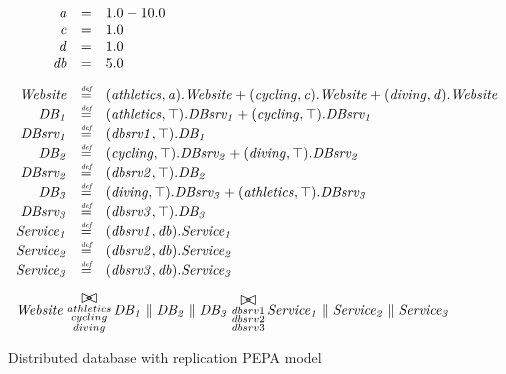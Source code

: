 \documentclass[runningheads]{llncs}
\begin{document}
\begin{figure}
	\centering
	\begin{displaymath}
	\begin{array}{rcl}
	\mathit{a} & = & 1.0-10.0\\
	\mathit{c} & = & 1.0\\
	\mathit{d} & = & 1.0\\
	\mathit{db} & = & 5.0\\
	[2.0ex]		\mathit{Website} & \rmdef & (\mathit{athletics},\mathit{a}).\mathit{Website}+(\mathit{cycling},\mathit{c}).\mathit{Website}+(\mathit{diving},\mathit{d}).\mathit{Website}\\
	\mathit{DB_1} & \rmdef & (\mathit{athletics},\top).\mathit{DBsrv_1}+(\mathit{cycling},\top).\mathit{DBsrv_1}\\
	\mathit{DBsrv_1} & \rmdef & (\mathit{dbsrv1},\top).\mathit{DB_1}\\
	\mathit{DB_2} & \rmdef & (\mathit{cycling},\top).\mathit{DBsrv_2}+(\mathit{diving},\top).\mathit{DBsrv_2}\\
	\mathit{DBsrv_2} & \rmdef & (\mathit{dbsrv2},\top).\mathit{DB_2}\\
	\mathit{DB_3} & \rmdef & (\mathit{diving},\top).\mathit{DBsrv_3}+(\mathit{athletics},\top).\mathit{DBsrv_3}\\
	\mathit{DBsrv_3} & \rmdef & (\mathit{dbsrv3},\top).\mathit{DB_3}\\
	\mathit{Service_1} & \rmdef & (\mathit{dbsrv1},\mathit{db}).\mathit{Service_1}\\
	\mathit{Service_2} & \rmdef & (\mathit{dbsrv2},\mathit{db}).\mathit{Service_2}\\
	\mathit{Service_3} & \rmdef & (\mathit{dbsrv3},\mathit{db}).\mathit{Service_3}\\
	[2.0ex]		\multicolumn{3}{l}{\mathit{Website}\sync{\substack{athletics\\cycling\\diving}}\mathit{DB_1}\parallel\mathit{DB_2}\parallel\mathit{DB_3}\sync{\substack{dbsrv1\\dbsrv2\\dbsrv3}}\mathit{Service_1}\parallel\mathit{Service_2}\parallel\mathit{Service_3}}\\
	[2.0ex]	\end{array}
	\end{displaymath}
	\caption{Distributed database with replication PEPA model}
	\label{figure:pepa_ddwr_model}
\end{figure}
\end{document}
